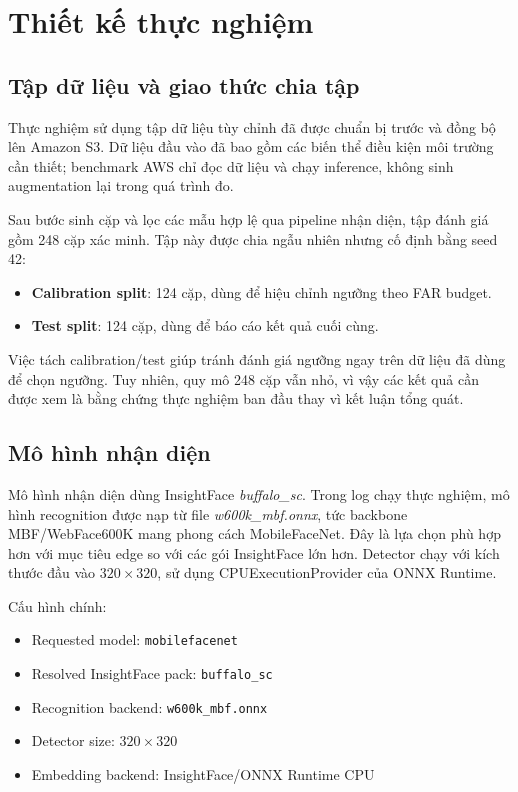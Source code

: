 \section{Thiết kế thực nghiệm}

\subsection{Tập dữ liệu và giao thức chia tập}

Thực nghiệm sử dụng tập dữ liệu tùy chỉnh đã được chuẩn bị trước và đồng bộ lên Amazon S3. Dữ liệu đầu vào đã bao gồm các biến thể điều kiện môi trường cần thiết; benchmark AWS chỉ đọc dữ liệu và chạy inference, không sinh augmentation lại trong quá trình đo.

Sau bước sinh cặp và lọc các mẫu hợp lệ qua pipeline nhận diện, tập đánh giá gồm 248 cặp xác minh. Tập này được chia ngẫu nhiên nhưng cố định bằng seed 42:

\begin{itemize}
    \item \textbf{Calibration split}: 124 cặp, dùng để hiệu chỉnh ngưỡng theo FAR budget.
    \item \textbf{Test split}: 124 cặp, dùng để báo cáo kết quả cuối cùng.
\end{itemize}

Việc tách calibration/test giúp tránh đánh giá ngưỡng ngay trên dữ liệu đã dùng để chọn ngưỡng. Tuy nhiên, quy mô 248 cặp vẫn nhỏ, vì vậy các kết quả cần được xem là bằng chứng thực nghiệm ban đầu thay vì kết luận tổng quát.

\subsection{Mô hình nhận diện}

Mô hình nhận diện dùng InsightFace \textit{buffalo\_sc}. Trong log chạy thực nghiệm, mô hình recognition được nạp từ file \textit{w600k\_mbf.onnx}, tức backbone MBF/WebFace600K mang phong cách MobileFaceNet. Đây là lựa chọn phù hợp hơn với mục tiêu edge so với các gói InsightFace lớn hơn. Detector chạy với kích thước đầu vào $320 \times 320$, sử dụng CPUExecutionProvider của ONNX Runtime.

Cấu hình chính:

\begin{itemize}
    \item Requested model: \texttt{mobilefacenet}
    \item Resolved InsightFace pack: \texttt{buffalo\_sc}
    \item Recognition backend: \texttt{w600k\_mbf.onnx}
    \item Detector size: $320 \times 320$
    \item Embedding backend: InsightFace/ONNX Runtime CPU
\end{itemize}

